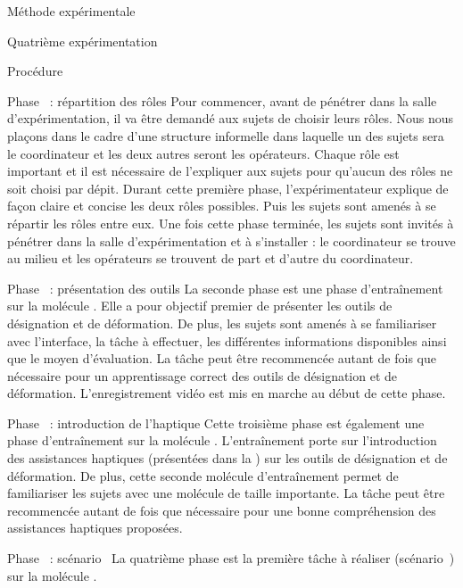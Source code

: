 \documentclass[myfrancais]{mythesis}
\begin{document}
\begin{mychapter}{Méthode expérimentale}
\begin{mysection}{Quatrième expérimentation}
\begin{mysubsection}{Procédure}
\begin{myparagraph}{Phase~ : répartition des rôles}
					Pour commencer, avant de pénétrer dans la salle d'expérimentation, il va être demandé aux sujets de choisir leurs rôles.
					Nous nous plaçons dans le cadre d'une structure informelle dans laquelle un des sujets sera le coordinateur et les deux autres seront les opérateurs.
					Chaque rôle est important et il est nécessaire de l'expliquer aux sujets pour qu'aucun des rôles ne soit choisi par dépit.
					Durant cette première phase, l'expérimentateur explique de façon claire et concise les deux rôles possibles.
					Puis les sujets sont amenés à se répartir les rôles entre eux.
					Une fois cette phase terminée, les sujets sont invités à pénétrer dans la salle d'expérimentation et à s'installer : le coordinateur se trouve au milieu et les opérateurs se trouvent de part et d'autre du coordinateur.
				\end{myparagraph}
				\begin{myparagraph}{Phase~ : présentation des outils}
					La seconde phase est une phase d'entraînement sur la molécule \myTRPCAGE.
					Elle a pour objectif premier de présenter les outils de désignation et de déformation.
					De plus, les sujets sont amenés à se familiariser avec l'interface, la tâche à effectuer, les différentes informations disponibles ainsi que le moyen d'évaluation.
					La tâche peut être recommencée autant de fois que nécessaire pour un apprentissage correct des outils de désignation et de déformation.
					L'enregistrement vidéo est mis en marche au début de cette phase.
				\end{myparagraph}
				\begin{myparagraph}{Phase~ : introduction de l'haptique}
					Cette troisième phase est également une phase d'entraînement sur la molécule \myPrion.
					L'entraînement porte sur l'introduction des assistances haptiques (présentées dans la ) sur les outils de désignation et de déformation.
					De plus, cette seconde molécule d'entraînement permet de familiariser les sujets avec une molécule de taille importante.
					La tâche peut être recommencée autant de fois que nécessaire pour une bonne compréhension des assistances haptiques proposées.
				\end{myparagraph}
				\begin{myparagraph}{Phase~ : scénario~}
					La quatrième phase est la première tâche à réaliser (scénario~) sur la molécule \myUbiquitin.

\end{myparagraph}
\end{mysubsection}
\end{mysection}
\end{mychapter}
\end{document}
